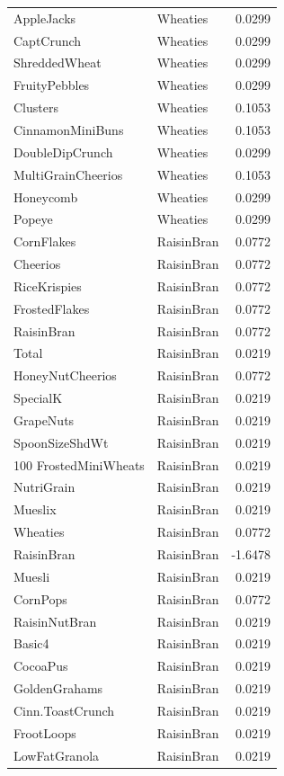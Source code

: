 \begin{longtable}{llr}
AppleJacks & Wheaties & 0.0299 \\
CaptCrunch & Wheaties & 0.0299 \\
ShreddedWheat & Wheaties & 0.0299 \\
FruityPebbles & Wheaties & 0.0299 \\
Clusters & Wheaties & 0.1053 \\
CinnamonMiniBuns & Wheaties & 0.1053 \\
DoubleDipCrunch & Wheaties & 0.0299 \\
MultiGrainCheerios & Wheaties & 0.1053 \\
Honeycomb & Wheaties & 0.0299 \\
Popeye & Wheaties & 0.0299 \\
CornFlakes & RaisinBran & 0.0772 \\
Cheerios & RaisinBran & 0.0772 \\
RiceKrispies & RaisinBran & 0.0772 \\
FrostedFlakes & RaisinBran & 0.0772 \\
RaisinBran & RaisinBran & 0.0772 \\
Total & RaisinBran & 0.0219 \\
HoneyNutCheerios & RaisinBran & 0.0772 \\
SpecialK & RaisinBran & 0.0219 \\
GrapeNuts & RaisinBran & 0.0219 \\
SpoonSizeShdWt & RaisinBran & 0.0219 \\
100%
FrostedMiniWheats & RaisinBran & 0.0219 \\
NutriGrain & RaisinBran & 0.0219 \\
Mueslix & RaisinBran & 0.0219 \\
Wheaties & RaisinBran & 0.0772 \\
RaisinBran & RaisinBran & -1.6478 \\
Muesli & RaisinBran & 0.0219 \\
CornPops & RaisinBran & 0.0772 \\
RaisinNutBran & RaisinBran & 0.0219 \\
Basic4 & RaisinBran & 0.0219 \\
CocoaPus & RaisinBran & 0.0219 \\
GoldenGrahams & RaisinBran & 0.0219 \\
Cinn.ToastCrunch & RaisinBran & 0.0219 \\
FrootLoops & RaisinBran & 0.0219 \\
LowFatGranola & RaisinBran & 0.0219 \\

\end{longtable}
